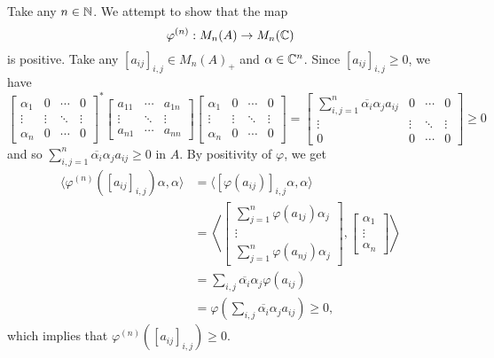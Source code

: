 \begin{myproof}
    Take any $n \in \mathbb {N}$. We attempt to show that the map
    $$\varphi^{(n)} : M_n (A) \to M_n (\mathbb {C})$$
    is positive. Take any $[a_{ij}]_{i, j} \in M_n (A)_+$ and $\alpha \in \mathbb {C}^n$.
    Since $[a_{ij}]_{i, j} \geq 0$, we have 
    $$\begin{bmatrix}
        \alpha_1 & 0 & \cdots & 0\\
        \vdots & \vdots & \ddots & \vdots\\
        \alpha_n & 0 & \cdots & 0
    \end{bmatrix}^* \begin{bmatrix}
        a_{11} & \cdots & a_{1n}\\
        \vdots & \ddots & \vdots\\
        a_{n1} & \cdots & a_{nn}
    \end{bmatrix} \begin{bmatrix}
        \alpha_1 & 0 & \cdots & 0\\
        \vdots & \vdots & \ddots & \vdots\\
        \alpha_n & 0 & \cdots & 0
    \end{bmatrix} = \begin{bmatrix}
        \sum_{i, j = 1} ^n \overline{\alpha_i} \alpha_j a_{ij} & 0 & \cdots & 0\\
        \vdots & \vdots & \ddots & \vdots\\
        0 & 0 & \cdots & 0 
    \end{bmatrix} \geq 0$$
    and so $\sum_{i, j = 1} ^n \overline{\alpha_i} \alpha_j a_{ij} \geq 0$ in $A$.
    By positivity of $\varphi$, we get 
    \begin{align*}
        \langle \varphi^{(n)} ([a_{ij}]_{i, j}) \alpha, \alpha \rangle &= \langle [\varphi(a_{ij})]_{i, j} \alpha, \alpha \rangle\\
        &= \left\langle \begin{bmatrix}
            \sum_{j = 1} ^n \varphi(a_{1j}) \alpha_j\\
            \vdots\\
            \sum_{j = 1} ^n \varphi(a_{nj}) \alpha_j
        \end{bmatrix}, \begin{bmatrix}
            \alpha_1\\
            \vdots\\
            \alpha_n
        \end{bmatrix} \right\rangle\\
        &= \sum_{i, j} \overline{\alpha_i} \alpha_j \varphi(a_{ij})\\
        &= \varphi \left(\sum_{i, j} \overline{\alpha_i} \alpha_j a_{ij}\right) \geq 0,
    \end{align*}
    which implies that $\varphi^{(n)} ([a_{ij}]_{i, j}) \geq 0$.
\end{myproof}

